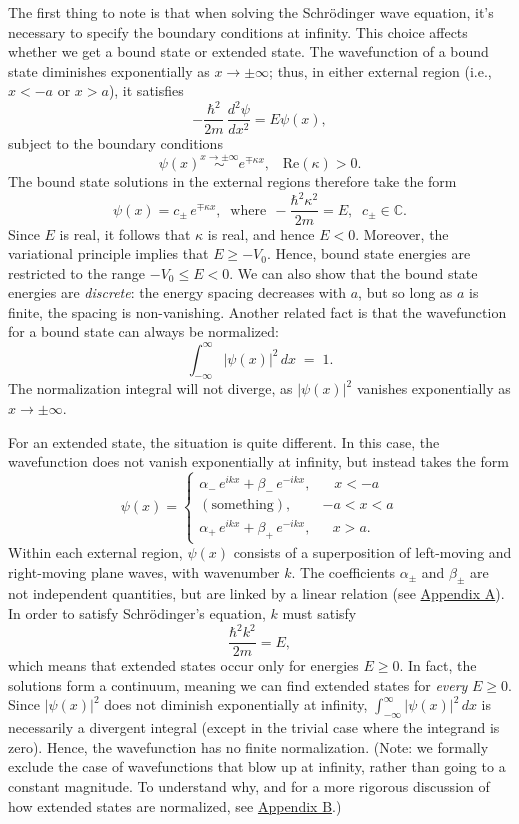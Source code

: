 \documentclass[pra,12pt]{revtex4}
\begin{document}
The first thing to note is that when solving the Schr\"odinger wave
equation, it's necessary to specify the boundary conditions at
infinity.  This choice affects whether we get a bound state or
extended state.  The wavefunction of a bound state diminishes
exponentially as $x \rightarrow \pm\infty$; thus, in either external
region (i.e., $x < -a$ or $x > a$), it satisfies
$$-\frac{\hbar^2}{2m}\,\frac{d^2\psi}{dx^2} = E \psi(x),$$
subject to the boundary conditions
$$\psi(x) \overset{x\rightarrow\pm\infty}{\sim} e^{\mp\kappa x}, \;\;\;\mathrm{Re}(\kappa) > 0.$$
The bound state solutions in the external regions therefore take the
form
$$\psi(x) = c_\pm\, e^{\mp\kappa x}, \;\;\mathrm{where}\;\, -\frac{\hbar^2\kappa^2}{2m} = E, \;\; c_\pm \in \mathbb{C}.$$
Since $E$ is real, it follows that $\kappa$ is real, and hence $E <
0$.  Moreover, the variational principle implies that $E \ge -V_0$.
Hence, bound state energies are restricted to the range $-V_0 \le E <
0$.  We can also show that the bound state energies are
\textit{discrete}: the energy spacing decreases with $a$, but so long
as $a$ is finite, the spacing is non-vanishing.  Another related
fact is that the wavefunction for a bound state can always be
normalized:
$$\int_{-\infty}^\infty |\psi(x)|^2\, dx\; =\; 1.$$
The normalization integral will not diverge, as $|\psi(x)|^2$ vanishes
exponentially as $x \rightarrow \pm \infty$.

For an extended state, the situation is quite different.  In this
case, the wavefunction does not vanish exponentially at infinity, but
instead takes the form
$$\psi(x) = \begin{cases} \alpha_-\, e^{ik x} + \beta_-\, e^{-ik x}, & \;\;\;x < -a\\ (\mathrm{something}) , & -a < x < a\\ \alpha_+\, e^{ik x} + \beta_+\, e^{-ik x} , & \;\;\,x > a.\end{cases}$$
Within each external region, $\psi(x)$ consists of a superposition of
left-moving and right-moving plane waves, with wavenumber $k$.  The
coefficients $\alpha_\pm$ and $\beta_\pm$ are not independent
quantities, but are linked by a linear relation (see
\hyperref[sec:appendix]{Appendix A}).  In order to satisfy
Schr\"odinger's equation, $k$ must satisfy
$$\frac{\hbar^2k^2}{2m} = E,$$
which means that extended states occur only for energies $E \ge 0$.
In fact, the solutions form a continuum, meaning we can find extended
states for \textit{every} $E \ge 0$.  Since $|\psi(x)|^2$ does not
diminish exponentially at infinity, $\int_{-\infty}^\infty
|\psi(x)|^2\, dx$ is necessarily a divergent integral (except in the
trivial case where the integrand is zero).  Hence, the wavefunction
has no finite normalization.  (Note: we formally exclude the case of
wavefunctions that blow up at infinity, rather than going to a
constant magnitude.  To understand why, and for a more rigorous
discussion of how extended states are normalized, see
\hyperref[sec:normalization]{Appendix B}.)
\end{document}
